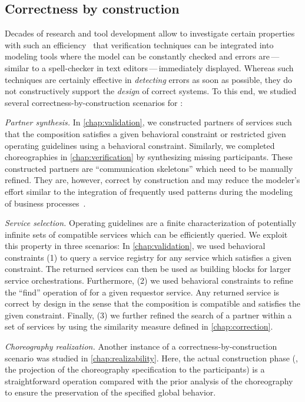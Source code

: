 \enlargethispage*{\baselineskip}


\subsection*{Correctness by construction}

Decades of research and tool development allow to investigate certain properties with such an efficiency~\cite{FahlandWJKLVW_2009_bpm} that verification techniques can be integrated into modeling tools where the model can be constantly checked and errors are\,---\,similar to a spell-checker in text editors\,---\,im\-me\-di\-ately displayed. Whereas such techniques are certainly effective in \emph{detecting} errors as soon as possible, they do not constructively support the \emph{design} of correct systems. To this end, we studied several correctness-by-\break construction scenarios for :
\begin{niceitemize}
\item \emph{Partner synthesis.} In \autoref{chap:validation}, we constructed partners of services such that the composition satisfies a given behavioral constraint or restricted given operating guidelines using a behavioral constraint. Similarly, we completed choreographies in \autoref{chap:verification} by synthesizing missing participants. These constructed partners are ``communication skeletons'' which need to be manually refined. They are, however, correct by construction and may reduce the modeler's effort similar to the integration of frequently used patterns during the modeling of business processes~\cite{GschwindKW_2008_bpm}.

\item \emph{Service selection.} Operating guidelines are a finite characterization of potentially infinite sets of compatible services which can be efficiently queried. We exploit this property in three scenarios: In \autoref{chap:validation}, we used behavioral constraints (1) to query a service registry for any service which satisfies a given constraint. The returned services can then be used as building blocks for larger service orchestrations. Furthermore, (2) we used behavioral constraints to refine the ``find'' operation of  for a given requestor service. Any returned service is correct by design in the sense that the composition is compatible and satisfies the given constraint. Finally, (3) we further refined the search of a partner within a set of services by using the similarity measure defined in \autoref{chap:correction}.

\item \emph{Choreography realization.} Another instance of a correctness-by-construction scenario was studied in \autoref{chap:realizability}. Here, the actual construction phase (\ie, the projection of the choreography specification to the participants) is a straightforward operation compared with the prior analysis of the choreography to ensure the preservation of the specified global behavior.
\end{niceitemize}




